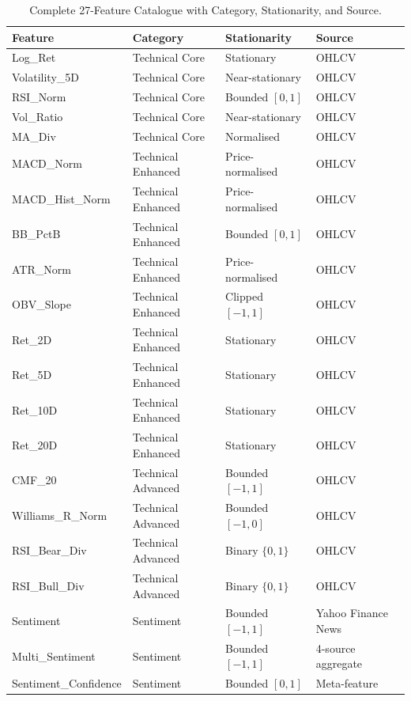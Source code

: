 \documentclass[10pt,a4paper,twoside]{article}
\begin{document}
\begin{table}[htb]
  \begin{center}
    {\caption{Complete 27-Feature Catalogue with Category, Stationarity, and
    Source.}\label{tab:features}}
    \begin{tabular}{|l|l|l|l|}
    \hline
    \textbf{Feature} & \textbf{Category} & \textbf{Stationarity} & \textbf{Source} \\
    \hline
    Log\_Ret & Technical Core & Stationary & OHLCV \\
    Volatility\_5D & Technical Core & Near-stationary & OHLCV \\
    RSI\_Norm & Technical Core & Bounded $[0,1]$ & OHLCV \\
    Vol\_Ratio & Technical Core & Near-stationary & OHLCV \\
    MA\_Div & Technical Core & Normalised & OHLCV \\
    \hline
    MACD\_Norm & Technical Enhanced & Price-normalised & OHLCV \\
    MACD\_Hist\_Norm & Technical Enhanced & Price-normalised & OHLCV \\
    BB\_PctB & Technical Enhanced & Bounded $[0,1]$ & OHLCV \\
    ATR\_Norm & Technical Enhanced & Price-normalised & OHLCV \\
    OBV\_Slope & Technical Enhanced & Clipped $[-1,1]$ & OHLCV \\
    Ret\_2D & Technical Enhanced & Stationary & OHLCV \\
    Ret\_5D & Technical Enhanced & Stationary & OHLCV \\
    Ret\_10D & Technical Enhanced & Stationary & OHLCV \\
    Ret\_20D & Technical Enhanced & Stationary & OHLCV \\
    \hline
    CMF\_20 & Technical Advanced & Bounded $[-1,1]$ & OHLCV \\
    Williams\_R\_Norm & Technical Advanced & Bounded $[-1,0]$ & OHLCV \\
    RSI\_Bear\_Div & Technical Advanced & Binary $\{0,1\}$ & OHLCV \\
    RSI\_Bull\_Div & Technical Advanced & Binary $\{0,1\}$ & OHLCV \\
    \hline
    Sentiment & Sentiment & Bounded $[-1,1]$ & Yahoo Finance News \\
    Multi\_Sentiment & Sentiment & Bounded $[-1,1]$ & 4-source aggregate \\
    Sentiment\_Confidence & Sentiment & Bounded $[0,1]$ & Meta-feature \\

\end{tabular}
\end{center}
\end{table}
\end{document}
